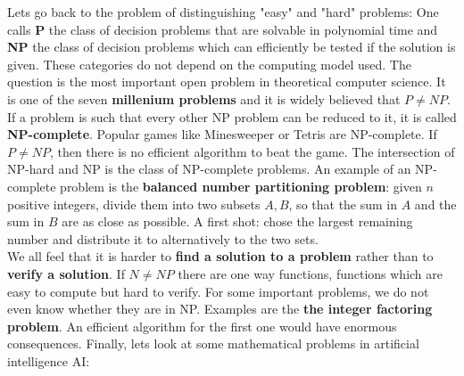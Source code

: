 \documentclass[12pt]{amsart}
\newcounter{example}    \def\example#1{ \item \fontsize{12}{15} \selectfont #1 \fontsize{12}{15} \selectfont }
\begin{document}
Lets go back to the problem of distinguishing "easy" and "hard" problems: 
One calls {\bf P} the class of decision problems that are solvable in polynomial time and
{\bf NP} the class of decision problems which can efficiently be tested if the solution is given.
These categories do not depend on the computing model used. The question 
is the most important open problem in theoretical computer science.  
It is one of the seven {\bf millenium problems} and it is widely believed that $P \neq NP$. 
If a problem is such that every other NP problem can be reduced to it, it is called {\bf NP-complete}. 
Popular games like Minesweeper or Tetris are NP-complete. If $P \neq NP$, then there is no efficient 
algorithm to beat the game. The intersection of NP-hard and NP is the class of NP-complete problems.
An example of an NP-complete problem is the {\bf balanced number partitioning problem}:
given $n$ positive integers, divide them into two subsets $A,B$, so that the sum in $A$ and the sum in $B$ 
are as close as possible. A first shot: chose the largest remaining number and distribute it to alternatively 
to the two sets. \\
We all feel that it is harder to {\bf find a solution to a problem} rather than to {\bf verify a solution}. 
If $N \neq NP$ there are one way functions, functions which are easy to compute but hard to verify. 
For some important problems, we do not even know whether they are in NP. Examples are the
{\bf the integer factoring problem}.
An efficient algorithm for the first one would have enormous consequences.
Finally, lets look at some mathematical problems in artificial intelligence AI: \\
\end{document}
